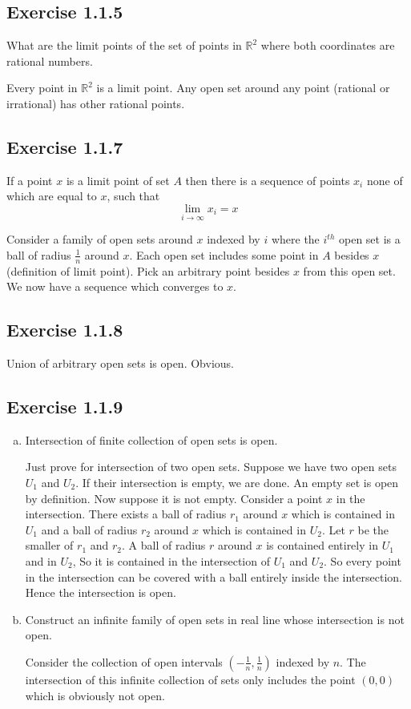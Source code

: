 \subsection*{Exercise 1.1.5}
What are the limit points of the set of points in $\mathbb{R}^2$ where
both coordinates are rational numbers.

Every point in $\mathbb{R}^2$ is a limit point. Any open set around any 
point (rational or irrational) has other rational points.

\subsection*{Exercise 1.1.7}
If a point $x$ is a limit point of set $A$ then there is a sequence of 
points $x_i$ none of which are equal to $x$, such that 
\[ \lim_{i\to\infty} x_i = x \]

Consider a family of open sets around $x$ indexed by $i$ where the 
$i^{th}$ open set is a ball of radius $\frac{1}{n}$ around $x$. Each open set includes some point in $A$ besides $x$ (definition of limit point). Pick an arbitrary point besides $x$ from this open set. We now have a sequence which converges to $x$.

\subsection*{Exercise 1.1.8}
Union of arbitrary open sets is open. Obvious.

\subsection*{Exercise 1.1.9}
\begin{enumerate}[(a)]
\item Intersection of finite collection of open sets is open.

Just prove for intersection of two open sets. Suppose we have two open
sets $U_1$ and $U_2$. If their intersection is empty, we are done. An
empty set is open by definition. Now suppose it is not empty. Consider a
point $x$ in the intersection. There exists a ball of radius $r_1$ around $x$ which is contained in $U_1$ and a ball of radius $r_2$ around $x$ 
which is contained in $U_2$. Let $r$ be the smaller of $r_1$ and $r_2$. A
ball of radius $r$ around $x$ is contained entirely in $U_1$ and in $U_2$,
So it is contained in the intersection of $U_1$ and $U_2$. So every 
point in the intersection can be covered with a ball entirely inside the
intersection. Hence the intersection is open.

\item Construct an infinite family of open sets in real line whose
intersection is not open.

Consider the collection of open intervals $(-\frac{1}{n}, \frac{1}{n})$
indexed by $n$. The intersection of this infinite collection of sets 
only includes the point $(0, 0)$ which is obviously not open.

\end{enumerate}

